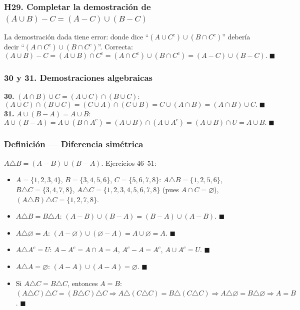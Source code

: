 \documentclass[12pt,a4paper]{article}
\begin{document}
\subsubsection*{\textcolor{accent}{H29. Completar la demostración de $(A\cup B)-C=(A-C)\cup(B-C)$}}
La demostración dada tiene error: donde dice ``$(A\cup C^c)\cup(B\cap C^c)$'' debería decir ``$(A\cap C^c)\cup(B\cap C^c)$''. Correcta:
\[
  (A\cup B)-C=(A\cup B)\cap C^c=(A\cap C^c)\cup(B\cap C^c)=(A-C)\cup(B-C).\;\blacksquare
\]

\subsubsection*{\textcolor{accent}{30 y 31. Demostraciones algebraicas}}
\textbf{30.} $(A\cap B)\cup C=(A\cup C)\cap(B\cup C)$:
\[
  (A\cup C)\cap(B\cup C)=(C\cup A)\cap(C\cup B)=C\cup(A\cap B)=(A\cap B)\cup C.\;\blacksquare
\]
\textbf{31.} $A\cup(B-A)=A\cup B$:
\[
  A\cup(B-A)=A\cup(B\cap A^c)=(A\cup B)\cap(A\cup A^c)=(A\cup B)\cap U=A\cup B.\;\blacksquare
\]

\subsubsection*{\textcolor{accent}{Definición — Diferencia simétrica}}
$A\triangle B=(A-B)\cup(B-A)$. Ejercicios 46–51:

\begin{itemize}
  \item[46.] $A=\{1,2,3,4\}$, $B=\{3,4,5,6\}$, $C=\{5,6,7,8\}$:
    $A\triangle B=\{1,2,5,6\}$, $B\triangle C=\{3,4,7,8\}$, $A\triangle C=\{1,2,3,4,5,6,7,8\}$ (pues $A\cap C=\varnothing$), $(A\triangle B)\triangle C=\{1,2,7,8\}$.
  \item[47.] $A\triangle B=B\triangle A$: $(A-B)\cup(B-A)=(B-A)\cup(A-B)$. $\blacksquare$
  \item[48.] $A\triangle\varnothing=A$: $(A-\varnothing)\cup(\varnothing-A)=A\cup\varnothing=A$. $\blacksquare$
  \item[49.] $A\triangle A^c=U$: $A-A^c=A\cap A=A$, $A^c-A=A^c$, $A\cup A^c=U$. $\blacksquare$
  \item[50.] $A\triangle A=\varnothing$: $(A-A)\cup(A-A)=\varnothing$. $\blacksquare$
  \item[H51.] Si $A\triangle C=B\triangle C$, entonces $A=B$: $(A\triangle C)\triangle C=(B\triangle C)\triangle C\Rightarrow A\triangle(C\triangle C)=B\triangle(C\triangle C)\Rightarrow A\triangle\varnothing=B\triangle\varnothing\Rightarrow A=B$. $\blacksquare$
\end{itemize}
\end{document}
